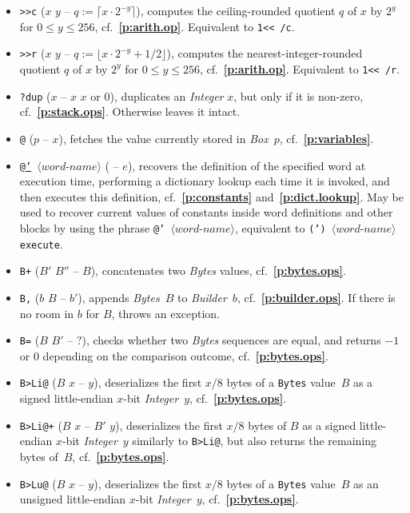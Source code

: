 \documentclass[12pt,oneside]{article}
\def\refpoint#1{{\rm\textbf{\ref{#1}}}}
\let\ptref=\refpoint
\begin{document}
\begin{itemize}
\item {\tt >{}>c} ($x$ $y$ -- $q:=\lceil x\cdot 2^{-y}\rceil$), computes the ceiling-rounded quotient $q$ of $x$ by $2^y$ for $0\leq y\leq 256$, cf.~\ptref{p:arith.op}. Equivalent to {\tt 1<{}< /c}.
\item {\tt >{}>r} ($x$ $y$ -- $q:=\lfloor x\cdot 2^{-y}+1/2\rfloor$), computes the nearest-integer-rounded quotient $q$ of $x$ by $2^y$ for $0\leq y\leq 256$, cf.~\ptref{p:arith.op}. Equivalent to {\tt 1<{}< /r}.
\item {\tt ?dup} ($x$ -- $x$ $x$ or $0$), duplicates an {\em Integer\/} $x$, but only if it is non-zero, cf.~\ptref{p:stack.ops}. Otherwise leaves it intact.
\item {\tt @} ($p$ -- $x$), fetches the value currently stored in {\em Box\/}~$p$, cf.~\ptref{p:variables}.
\item {\tt \underline{@'} $\langle\textit{word-name}\rangle$} ( -- $e$), recovers the definition of the specified word at execution time, performing a dictionary lookup each time it is invoked, and then executes this definition, cf.~\ptref{p:constants} and~\ptref{p:dict.lookup}. May be used to recover current values of constants inside word definitions and other blocks by using the phrase {\tt @' $\langle\textit{word-name}\rangle$}, equivalent to {\tt (') $\langle\textit{word-name}\rangle$ execute}.
\item {\tt B+} ($B'$ $B''$ -- $B$), concatenates two {\em Bytes\/} values, cf.~\ptref{p:bytes.ops}.
\item {\tt B,} ($b$ $B$ -- $b'$), appends {\em Bytes\/}~$B$ to {\em Builder\/}~$b$, cf.~\ptref{p:builder.ops}. If there is no room in $b$ for $B$, throws an exception.
\item {\tt B=} ($B$ $B'$ -- $?$), checks whether two {\em Bytes\/} sequences are equal, and returns $-1$ or $0$ depending on the comparison outcome, cf.~\ptref{p:bytes.ops}.
\item {\tt B>Li@} ($B$ $x$ -- $y$), deserializes the first $x/8$ bytes of a {\tt Bytes} value~$B$ as a signed little-endian $x$-bit {\em Integer}~$y$, cf.~\ptref{p:bytes.ops}.
\item {\tt B>Li@+} ($B$ $x$ -- $B'$ $y$), deserializes the first $x/8$ bytes of $B$ as a signed little-endian $x$-bit {\em Integer}~$y$ similarly to {\tt B>Li@}, but also returns the remaining bytes of~$B$, cf.~\ptref{p:bytes.ops}.
\item {\tt B>Lu@} ($B$ $x$ -- $y$), deserializes the first $x/8$ bytes of a {\tt Bytes} value~$B$ as an unsigned little-endian $x$-bit {\em Integer}~$y$, cf.~\ptref{p:bytes.ops}.

\end{itemize}
\end{document}
